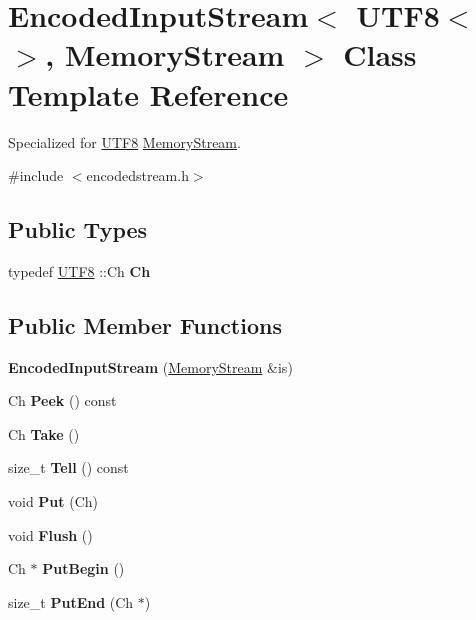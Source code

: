 \hypertarget{a02128}{}\section{Encoded\+Input\+Stream$<$ U\+T\+F8$<$$>$, Memory\+Stream $>$ Class Template Reference}
\label{a02128}


Specialized for \hyperlink{a02144}{U\+T\+F8} \hyperlink{a02296}{Memory\+Stream}.  




{\ttfamily \#include $<$encodedstream.\+h$>$}

\subsection*{Public Types}
\begin{DoxyCompactItemize}
\item 
\mbox{\label{a02128_a091eb31dd2554bf10054148953f9b3bf}} 
typedef \hyperlink{a02144}{U\+T\+F8} \+::Ch {\bfseries Ch}
\end{DoxyCompactItemize}
\subsection*{Public Member Functions}
\begin{DoxyCompactItemize}
\item 
\mbox{\label{a02128_a45ae1fa4f5bb8295df234fa3ac91ddef}} 
{\bfseries Encoded\+Input\+Stream} (\hyperlink{a02296}{Memory\+Stream} \&is)
\item 
\mbox{\label{a02128_aea936f1f1042f3b759cb95bdedf769b6}} 
Ch {\bfseries Peek} () const
\item 
\mbox{\label{a02128_a29eeabe922bb6c7cbb5c16fe8a3a7859}} 
Ch {\bfseries Take} ()
\item 
\mbox{\label{a02128_a34ffcddbbfd66aa4ea36ad6944ac9875}} 
size\+\_\+t {\bfseries Tell} () const
\item 
\mbox{\label{a02128_a39fe296cfa45d7f8ef5adc0dd30036c2}} 
void {\bfseries Put} (Ch)
\item 
\mbox{\label{a02128_ad911c889ebd4ded9bcf9d31ca124f9a7}} 
void {\bfseries Flush} ()
\item 
\mbox{\label{a02128_a3ca21c33ccc4a12fe2f806b865bd3ebd}} 
Ch $\ast$ {\bfseries Put\+Begin} ()
\item 
\mbox{\label{a02128_ad87990d605c72529aeb78509d5b393fb}} 
size\+\_\+t {\bfseries Put\+End} (Ch $\ast$)
\end{DoxyCompactItemize}
